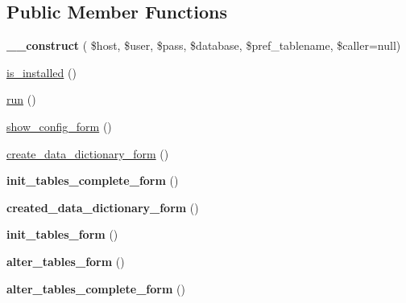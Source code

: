 \subsection*{Public Member Functions}
\begin{DoxyCompactItemize}
\item 
\hypertarget{classksf__data__dictionary__ui_a2e77b829675b895057a095e1f848ddcf}{}\label{classksf__data__dictionary__ui_a2e77b829675b895057a095e1f848ddcf} 
{\bfseries \+\_\+\+\_\+construct} ( \$host, \$user, \$pass, \$database, \$pref\+\_\+tablename, \$caller=null)
\item 
\hyperlink{classksf__data__dictionary__ui_a0a29d77c9427ed3b3c76926f3810fab5}{is\+\_\+installed} ()
\item 
\hyperlink{classksf__data__dictionary__ui_a718a382712dc59fe7541a6dc77c5d1c0}{run} ()
\item 
\hyperlink{classksf__data__dictionary__ui_a3c01247145824cdf9ad196e2c1e1ad80}{show\+\_\+config\+\_\+form} ()
\item 
\hyperlink{classksf__data__dictionary__ui_ac0d782167419454b7bbba4a8aa3e98e1}{create\+\_\+data\+\_\+dictionary\+\_\+form} ()
\item 
\hypertarget{classksf__data__dictionary__ui_a40244068b94acbc83667a3db70a65dd8}{}\label{classksf__data__dictionary__ui_a40244068b94acbc83667a3db70a65dd8} 
{\bfseries init\+\_\+tables\+\_\+complete\+\_\+form} ()
\item 
\hypertarget{classksf__data__dictionary__ui_afbff679af2f43df46442270aa8684b88}{}\label{classksf__data__dictionary__ui_afbff679af2f43df46442270aa8684b88} 
{\bfseries created\+\_\+data\+\_\+dictionary\+\_\+form} ()
\item 
\hypertarget{classksf__data__dictionary__ui_ae72e2830a5968177c20c70884cc78e54}{}\label{classksf__data__dictionary__ui_ae72e2830a5968177c20c70884cc78e54} 
{\bfseries init\+\_\+tables\+\_\+form} ()
\item 
\hypertarget{classksf__data__dictionary__ui_a50ce94fab9edff56f02cb2cc5f64e8d5}{}\label{classksf__data__dictionary__ui_a50ce94fab9edff56f02cb2cc5f64e8d5} 
{\bfseries alter\+\_\+tables\+\_\+form} ()
\item 
\hypertarget{classksf__data__dictionary__ui_aec7ec64ecde5afe4ff026b0c2d4dea12}{}\label{classksf__data__dictionary__ui_aec7ec64ecde5afe4ff026b0c2d4dea12} 
{\bfseries alter\+\_\+tables\+\_\+complete\+\_\+form} ()
\item 
\hypertarget{classksf__data__dictionary__ui_a2e77b829675b895057a095e1f848ddcf}{}\label{classksf__data__dictionary__ui_a2e77b829675b895057a095e1f848ddcf} 

\end{DoxyCompactItemize}
